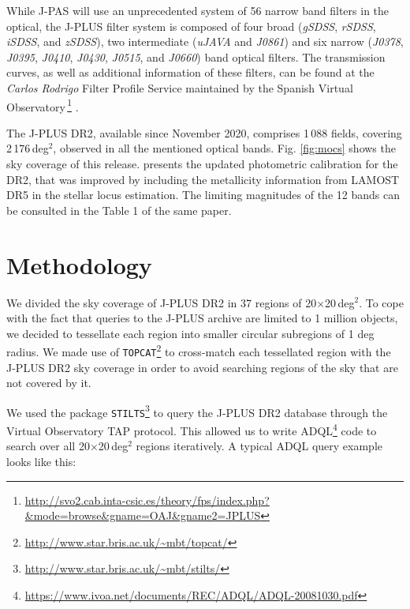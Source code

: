 While J-PAS will use an unprecedented system of 56 narrow band filters in the optical, the J-PLUS filter system is composed of four broad  (\textit{gSDSS}, \textit{rSDSS}, \textit{iSDSS}, and \textit{zSDSS}), two intermediate (\textit{uJAVA} and \textit{J0861}) and six narrow (\textit{J0378}, \textit{J0395}, \textit{J0410}, \textit{J0430}, \textit{J0515}, and \textit{J0660}) band optical filters. The transmission curves, as well as additional information of these filters, can be found at the \textit{Carlos Rodrigo} Filter Profile Service maintained by the Spanish Virtual Observatory\,\footnote{\url{http://svo2.cab.inta-csic.es/theory/fps/index.php?&mode=browse&gname=OAJ&gname2=JPLUS}} \citep{fps}.

The J-PLUS DR2, available since November 2020, comprises 1\,088 fields, covering 2\,176\,deg$^2$, observed in all the mentioned optical bands. Fig. \ref{fig:mocs} shows the sky coverage of this release. \citet{jpluscal} presents the updated photometric calibration for the DR2, that was improved by including the metallicity information from LAMOST DR5 in the stellar locus estimation. The limiting magnitudes of the 12 bands can be consulted in the Table 1 of the same paper.


\section{Methodology} \label{Methodology}



We divided the sky coverage of J-PLUS DR2 in 37 regions of 20$\times$20\,deg$^2$. To cope with the fact that queries to the J-PLUS archive are limited to 1 million objects, we decided to tessellate each region into smaller circular subregions of 1 deg radius. We made use of \texttt{TOPCAT}\footnote{\url{http://www.star.bris.ac.uk/~mbt/topcat/}} \citep{Taylor2005} to cross-match each tessellated region with the J-PLUS DR2 sky coverage in order to avoid searching regions of the sky that are not covered by it.


We used the package \texttt{STILTS}\footnote{\url{http://www.star.bris.ac.uk/~mbt/stilts/}} \citep{Taylor2006} to query the J-PLUS DR2 database through the Virtual Observatory TAP protocol. This allowed us to write ADQL\footnote{\url{https://www.ivoa.net/documents/REC/ADQL/ADQL-20081030.pdf}} code to search over all 20$\times$20\,deg$^2$ regions iteratively. A typical ADQL query example looks like this:

